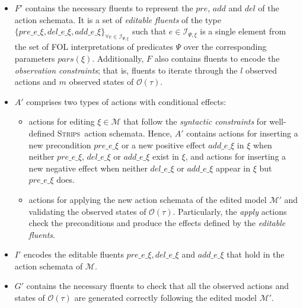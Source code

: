 \documentclass[letterpaper]{article} %
\newcommand{\strips}{\textsc{Strips}}     %
\begin{document}
\begin{itemize}
\item $F'$ contains the necessary fluents to represent the $pre$, $add$ and $del$ of the action schemata. It is a set of \emph{editable fluents} of the type $\{pre\_e\_\xi, del\_e\_\xi, add\_e\_\xi\}_{\forall e\in{\mathcal I}_{\Psi,\xi}}$ such that $e\in{\mathcal I}_{\Psi,\xi}$ is a single element from the set of FOL interpretations of predicates $\Psi$ over the corresponding parameters $pars(\xi)$. Additionally, $F$ also contains fluents to encode the \emph{observation constraints}; that is, fluents to iterate through the $l$ observed actions and $m$ observed states of $\mathcal{O(\tau)}$.
\item $A'$ comprises two types of actions with conditional effects:
    \begin{itemize}
    \item actions for editing $\xi \in \mathcal{M}$ that follow the \emph{syntactic constraints} for well-defined \strips\ action schemata. Hence, $A'$ contains actions for inserting a new precondition $pre\_e\_\xi$ or a new positive effect $add\_e\_\xi$ in $\xi$ when neither $pre\_e\_\xi$, $del\_e\_\xi$ or $add\_e\_\xi$ exist in $\xi$, and actions for inserting a new negative effect when neither $del\_e\_\xi$ or $add\_e\_\xi$ appear in $\xi$ but $pre\_e\_\xi$ does.
    \item actions for applying the new action schemata of the edited model $\mathcal{M'}$ and validating the observed states of $\mathcal{O(\tau)}$. Particularly, the \emph{apply} actions check the preconditions and produce the effects defined by the \emph{editable fluents}.
    \end{itemize}
\item $I'$ encodes the editable fluents $pre\_e\_\xi, del\_e\_\xi$ and $add\_e\_\xi$ that hold in the action schemata of $\mathcal{M}$.
\item $G'$ contains the necessary fluents to check that all the observed actions and states of $\mathcal{O(\tau)}$ are generated correctly following the edited model $\mathcal{M'}$.
\end{itemize}
\end{document}
